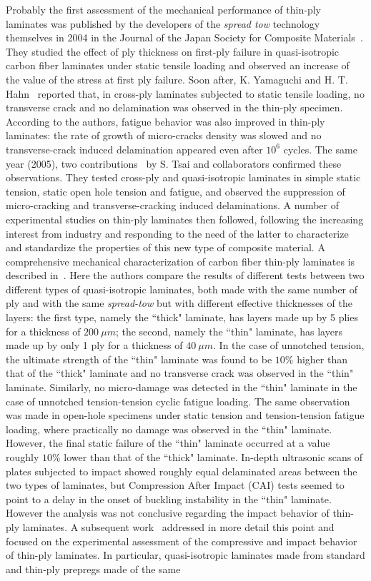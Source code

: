 Probably the first assessment of the mechanical performance of thin-ply laminates was published by the developers of the \emph{spread tow} technology themselves in 2004 in the Journal of the Japan Society for Composite Materials~\cite{sasayamaJSCM2004}. They studied the effect of ply thickness on first-ply failure in quasi-isotropic carbon fiber laminates under static tensile loading and observed an increase of the value of the stress at first ply failure.  Soon after, K. Yamaguchi and H. T. Hahn~\cite{Yamaguchi2005} reported that, in cross-ply laminates subjected to static tensile loading, no transverse crack and no delamination was observed in the thin-ply specimen. According to the authors, fatigue behavior was also improved in thin-ply laminates: the rate of growth of micro-cracks density was slowed and no transverse-crack induced delamination appeared even after $10^{6}$ cycles. The same year (2005), two contributions~\cite{TsaiICCM2005,Tsai2005} by S. Tsai and collaborators confirmed these observations. They tested cross-ply and quasi-isotropic laminates in simple static tension, static open hole tension and fatigue, and observed the suppression of micro-cracking and transverse-cracking induced delaminations. A number of experimental studies on thin-ply laminates then followed, following the increasing interest from industry and responding to the need of the latter to characterize and standardize the properties of this new type of composite material. A comprehensive mechanical characterization of carbon fiber thin-ply laminates is described in~\cite{Sihn2007}. Here the authors compare the results of different tests between two different types of quasi-isotropic laminates, both made with the same number of ply and with the same \emph{spread-tow} but with different effective thicknesses of the layers: the first type, namely the ``thick" laminate, has layers made up by 5 plies for a thickness of $200\ \mu m$; the second, namely the ``thin" laminate, has layers made up by only 1 ply for a thickness of $40\ \mu m$. In the case of unnotched tension, the ultimate strength of the ``thin" laminate was found to be $10\%$ higher than that of the ``thick" laminate and no transverse crack was observed in the ``thin" laminate. Similarly, no micro-damage was detected in the ``thin" laminate in the case of unnotched tension-tension cyclic fatigue loading. The same observation was made in open-hole specimens under static tension and tension-tension fatigue loading, where practically no damage was observed in the ``thin" laminate. However, the final static failure of the ``thin" laminate occurred at a value roughly $10\%$ lower than that of the ``thick" laminate. In-depth ultrasonic scans of plates subjected to impact showed roughly equal delaminated areas between the two types of laminates, but Compression After Impact (CAI) tests seemed to point to a delay in the onset of buckling instability in the ``thin" laminate. However the analysis was not conclusive regarding the impact behavior of thin-ply laminates. A subsequent work~\cite{Yokozeki2008} addressed in more detail this point and focused on the experimental assessment of the compressive and impact behavior of thin-ply laminates. In particular, quasi-isotropic laminates made from standard and thin-ply prepregs made of the same 